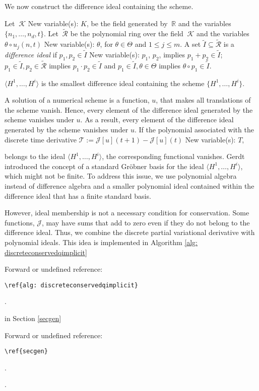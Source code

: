 \documentclass[runningheads]{llncs}
\newcommand{\1}{\chi}
\begin{document}
We now construct the difference ideal containing the scheme.
\begin{definition}
	\label{diffideal}
	Let \(\ \mathcal{K}\)
{\color{blue} New variable(s): \(K\),  }
 be the field generated by \(\ \mathbb{R}\) and the variables \(\{n_1,\ldots,n_d,t\}\). Let \(\ \tilde{\mathcal{R}}\) be the polynomial ring over the field \(\ \mathcal{K}\) and the variables \(\theta\circ u_j(n,t)\)
{\color{blue} New variable(s): \(\theta\),  }
 for \(\theta\in\Theta\) and \(1\leq j\leq m\).
	A set \(\tilde{I}\subseteq\tilde{\mathcal{R}}\) is a \emph{difference ideal} if
	\(p_1,p_2\in\tilde{I}\)
{\color{blue} New variable(s): \(p_1\), \(p_2\),  }
 implies \(p_1+p_2\in\tilde{I}\);
	\(p_1\in\tilde{I},p_2\in\tilde{\mathcal{R}}\) implies \(p_1\cdot p_2\in\tilde{I}\) and
	\(p_1\in\tilde{I},\theta\in\Theta\) implies \(\theta\circ p_1\in\tilde{I}\).
\end{definition}
\begin{definition}
	\(\langle H^1,\ldots,H^i\rangle\) is the smallest difference ideal containing the scheme \(\{H^1,\ldots,H^i\}\).
\end{definition}


A solution of a numerical scheme is a function, \(u\), that makes all translations of the scheme vanish. Hence, every element of the difference ideal generated by the scheme vanishes under \(u\). As a result, every element of the difference ideal generated by the scheme vanishes under \(u\). If the polynomial associated with the discrete time derivative  \(\mathcal{T}:=\mathcal{J}[u](t+1)-\mathcal{J}[u](t)\)
{\color{blue} New variable(s): \(T\),  }

belongs to the ideal \(\langle H^1,\ldots,H^i\rangle\), the corresponding functional vanishes. 
 Gerdt introduced the concept of a standard  Gr{\"o}bner basis for the ideal \(\langle H^1,\ldots,H^i\rangle\), which might not be finite. To address this issue, we use polynomial algebra instead of difference algebra and a smaller polynomial ideal contained within the difference ideal that has a finite standard basis.
 
 However, ideal membership is not  a necessary condition for conservation. Some functions, \(\mathcal{J}\),
 may have sums that add to zero even if they do not belong to the difference ideal. Thus, we combine the discrete partial variational derivative with polynomial ideals. This idea is implemented in Algorithm \ref{alg: discreteconservedqimplicit}
 {\color{red} Forward or undefined reference: \begin{verbatim}\ref{alg: discreteconservedqimplicit}\end{verbatim}.}
 in Section \ref{secgen}
 {\color{red} Forward or undefined reference: \begin{verbatim}\ref{secgen}\end{verbatim}.}
.
\end{document}
